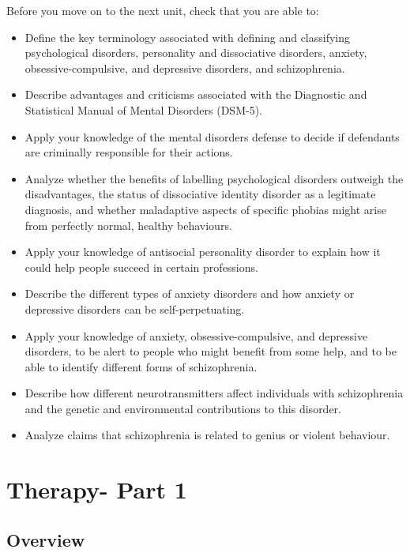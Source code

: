 \documentclass[
]{book}
\begin{document}
\begin{progress}
Before you move on to the next unit, check that you are able to:

\begin{itemize}
\item
  Define the key terminology associated with defining and classifying psychological disorders, personality and dissociative disorders, anxiety, obsessive-compulsive, and depressive disorders, and schizophrenia.
\item
  Describe advantages and criticisms associated with the Diagnostic and Statistical Manual of Mental Disorders (DSM-5).
\item
  Apply your knowledge of the mental disorders defense to decide if defendants are criminally responsible for their actions.
\item
  Analyze whether the benefits of labelling psychological disorders outweigh the disadvantages, the status of dissociative identity disorder as a legitimate diagnosis, and whether maladaptive aspects of specific phobias might arise from perfectly normal, healthy behaviours.
\item
  Apply your knowledge of antisocial personality disorder to explain how it could help people succeed in certain professions.
\item
  Describe the different types of anxiety disorders and how anxiety or depressive disorders can be self-perpetuating.
\item
  Apply your knowledge of anxiety, obsessive-compulsive, and depressive disorders, to be alert to people who might benefit from some help, and to be able to identify different forms of schizophrenia.
\item
  Describe how different neurotransmitters affect individuals with schizophrenia and the genetic and environmental contributions to this disorder.
\item
  Analyze claims that schizophrenia is related to genius or violent behaviour.
\end{itemize}
\end{progress}

\hypertarget{therapy--part-1}{%
\chapter{Therapy- Part 1}\label{therapy--part-1}}

\hypertarget{overview-9}{%
\section*{Overview}\label{overview-9}}
\end{document}

